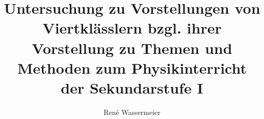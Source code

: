 

\title{
Untersuchung zu Vorstellungen von Viertklässlern bzgl. ihrer Vorstellung zu Themen und Methoden zum Physikinterricht der Sekundarstufe I
}

\author{
René Wassermeier
}



%
%


	
	
	\onehalfspacing	%



	
	
	\versicherung %

	


